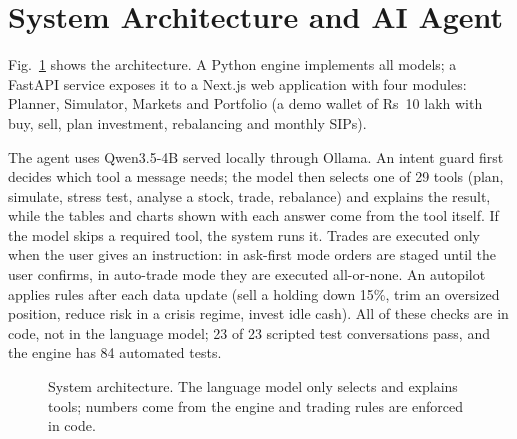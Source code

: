\documentclass[conference]{IEEEtran}
\begin{document}
\section{System Architecture and AI Agent}
Fig.~\ref{fig:arch} shows the architecture. A Python engine implements all models; a FastAPI service exposes it to a Next.js web application with four modules: Planner, Simulator, Markets and Portfolio (a demo wallet of Rs~10 lakh with buy, sell, plan investment, rebalancing and monthly SIPs).

The agent uses Qwen3.5-4B served locally through Ollama. An intent guard first decides which tool a message needs; the model then selects one of 29 tools (plan, simulate, stress test, analyse a stock, trade, rebalance) and explains the result, while the tables and charts shown with each answer come from the tool itself. If the model skips a required tool, the system runs it. Trades are executed only when the user gives an instruction: in ask-first mode orders are staged until the user confirms, in auto-trade mode they are executed all-or-none. An autopilot applies rules after each data update (sell a holding down 15\%, trim an oversized position, reduce risk in a crisis regime, invest idle cash). All of these checks are in code, not in the language model; 23 of 23 scripted test conversations pass, and the engine has 84 automated tests.

\begin{figure}[t]
\centering
{}
\caption{System architecture. The language model only selects and explains tools; numbers come from the engine and trading rules are enforced in code.}
\label{fig:arch}
\end{figure}
\end{document}
